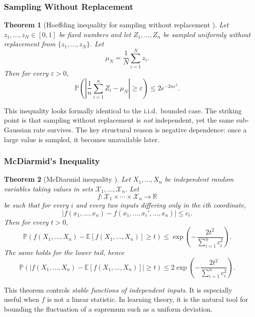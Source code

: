 \documentclass{article}
\newtheorem{theorem}{Theorem}[section]
\theoremstyle{definition}
\theoremstyle{remark}
\newcommand{\EE}{\mathbb{E}}
\newcommand{\PP}{\mathbb{P}}
\begin{document}
\subsubsection{Sampling Without Replacement}

\begin{theorem}[Hoeffding inequality for sampling without replacement \cite{Hoeffding1963,Serfling1974}]
\label{thm:hoeffding-without-replacement}
Let $z_1,\dots,z_N \in [0,1]$ be fixed numbers and let $Z_1,\dots,Z_n$ be sampled uniformly without replacement from $\{z_1,\dots,z_N\}$. Let
$$
\mu_N = \frac{1}{N}\sum_{i=1}^N z_i.
$$
Then for every $\varepsilon > 0$,
$$
\PP\!\left(
\left|
\frac{1}{n}\sum_{i=1}^n Z_i - \mu_N
\right| \ge \varepsilon
\right)
\le
2e^{-2n\varepsilon^2}.
$$
\end{theorem}

This inequality looks formally identical to the i.i.d.\ bounded case. The striking point is that sampling without replacement is \emph{not} independent, yet the same sub-Gaussian rate survives. The key structural reason is negative dependence: once a large value is sampled, it becomes unavailable later.

\subsubsection{McDiarmid's Inequality}

\begin{theorem}[McDiarmid inequality \cite{McDiarmid1989}]
\label{thm:mcdiarmid}
Let $X_1,\dots,X_n$ be independent random variables taking values in sets $\mathcal{X}_1,\dots,\mathcal{X}_n$. Let
$$
f:\mathcal{X}_1 \times \cdots \times \mathcal{X}_n \to \mathbb{R}
$$
be such that for every $i$ and every two inputs differing only in the $i$th coordinate,
$$
|f(x_1,\dots,x_n)-f(x_1,\dots,x_i',\dots,x_n)| \le c_i.
$$
Then for every $t>0$,
$$
\PP\!\left(
f(X_1,\dots,X_n)-\EE[f(X_1,\dots,X_n)] \ge t
\right)
\le
\exp\!\left(
-\frac{2t^2}{\sum_{i=1}^n c_i^2}
\right).
$$
The same holds for the lower tail, hence
$$
\PP\!\left(
\left|f(X_1,\dots,X_n)-\EE[f(X_1,\dots,X_n)]\right| \ge t
\right)
\le
2\exp\!\left(
-\frac{2t^2}{\sum_{i=1}^n c_i^2}
\right).
$$
\end{theorem}

This theorem controls \emph{stable functions of independent inputs}. It is especially useful when $f$ is not a linear statistic. In learning theory, it is the natural tool for bounding the fluctuation of a supremum such as a uniform deviation.
\end{document}

